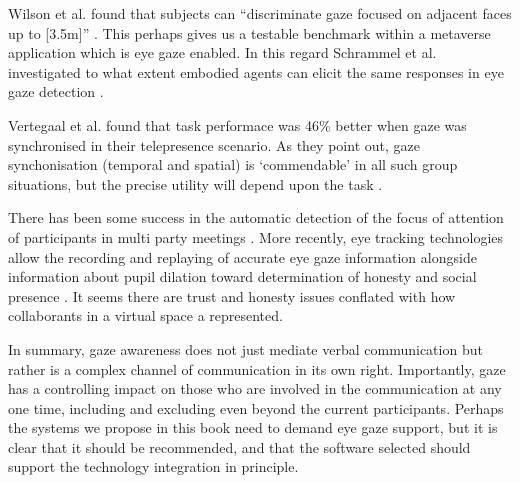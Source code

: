 Wilson et al. found that subjects can ``discriminate gaze focused on adjacent faces up to [3.5m]'' \cite{Wilson2000}. This perhaps gives us a testable benchmark within a metaverse application which is eye gaze enabled. In this regard Schrammel et al. investigated to what extent embodied agents can elicit the same responses in eye gaze detection \cite{Schrammel2007}.\par       
Vertegaal et al. found that task performace was 46\% better when gaze was synchronised in their telepresence scenario. As they point out, gaze synchonisation (temporal and spatial) is `commendable' in all such group situations, but the precise utility will depend upon the task \cite{Vertegaal2002}.\par
There has been some success in the automatic detection of the focus of attention of participants in multi party meetings \cite{Stiefelhagen2001, Stiefelhagen2002}.  More recently, eye tracking technologies allow the recording and replaying of accurate eye gaze information \cite{Steptoe2009} alongside information about pupil dilation toward determination of honesty and social presence \cite{Steptoe2010}. It seems there are trust and honesty issues conflated with how collaborants in a virtual space a represented.\par               
In summary, gaze awareness does not just mediate verbal communication but rather is a complex channel of communication in its own right. Importantly, gaze has a controlling impact on those who are involved in the communication at any one time, including and excluding even beyond the current participants. Perhaps the systems we propose in this book need to demand eye gaze support, but it is clear that it should be recommended, and that the software selected should support the technology integration in principle.\par
